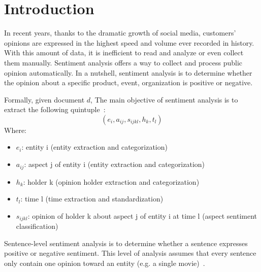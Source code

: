 \section{Introduction}
In recent years, thanks to the dramatic growth of social media, customers' opinions are expressed in the highest speed and volume ever recorded in history.
With this amount of data, it is inefficient to read and analyze or even collect them manually. 
Sentiment analysis offers a way to collect and process public opinion automatically.
In a nutshell, sentiment analysis is to determine whether the opinion about a specific product, event, organization is positive or negative. 

Formally, given document $d$, The main objective of sentiment analysis is to extract the following quintuple~\cite{liu2012sentiment}:
\[ ( e_{i}, a_{ij}, s_{ijkl}, h_{k}, t_{l} ) \]
Where:
\begin{itemize}
	\item $e_{i}$: entity i (entity extraction and categorization)
	\item $a_{ij}$: aspect j of entity i (entity extraction and categorization)
	\item $h_{k}$: holder k (opinion holder extraction and categorization)
	\item $t_{l}$: time l (time extraction and standardization)
	\item $s_{ijkl}$: opinion of holder k about aspect j of entity i at time l (aspect sentiment classification)
\end{itemize}
Sentence-level sentiment analysis is to determine whether a sentence expresses positive or negative sentiment. 
This level of analysis assumes that every sentence only contain one opinion toward an entity (e.g. a single movie)~\cite{liu2012sentiment}.

